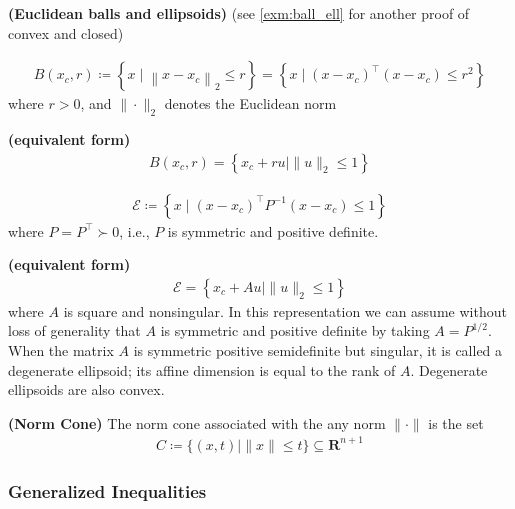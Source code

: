 \documentclass{article}
\newcommand{\bfs}[1]{\textbf{({#1}) }}
\begin{document}
\begin{exma}{\bfs{Euclidean balls and ellipsoids}}
(see \cref{exm:ball_ell} for another proof of convex and closed)

\begin{align*}
B\left(x_{c}, r\right)\coloneqq\left\{x \mid\left\|x-x_{c}\right\|_{2} \leq r\right\}=\left\{x \mid\left(x-x_{c}\right)^{\top}\left(x-x_{c}\right) \leq r^{2}\right\}
\end{align*}
where $r>0$, and $\|\cdot\|_{2}$ denotes the Euclidean norm
\begin{rema}{\bfs{equivalent form}}
\begin{align*}
B\left(x_{c}, r\right)=\left\{x_{c}+r u \mid\|u\|_{2} \leq 1\right\}
\end{align*}
\end{rema}
\begin{align*}
\mathcal{E}\coloneqq\left\{x \mid\left(x-x_{c}\right)^{\top} P^{-1}\left(x-x_{c}\right) \leq 1\right\}
\end{align*}
where $P=P^{\top} \succ 0$, i.e., $P$ is symmetric and positive definite. 
\begin{rema}{\bfs{equivalent form}}
\begin{align*}
\mathcal{E}=\left\{x_{c}+A u \mid\|u\|_{2} \leq 1\right\}
\end{align*}
where $A$ is square and nonsingular. In this representation we can assume without loss of generality that $A$ is symmetric and positive definite by taking $A=P^{1 / 2}$. When the matrix $A$ is symmetric positive semidefinite but singular, it is called a degenerate ellipsoid; its affine dimension is equal to the rank of $A$. Degenerate ellipsoids are also convex.
\end{rema}
\end{exma}
\begin{exma}{\bfs{Norm Cone}}
The norm cone associated with the any norm $\|\cdot\|$ is the set
\begin{align*}
C\coloneqq\{(x, t) \mid\|x\| \leq t\} \subseteq \mathbf{R}^{n+1}
\end{align*}
\end{exma}

\subsubsection{Generalized Inequalities}
\end{document}

